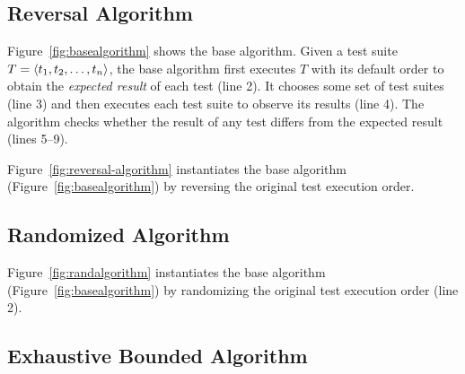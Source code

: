 \subsection{Reversal Algorithm}
\label{sec:reversal}


Figure~\ref{fig:basealgorithm} shows the base algorithm.
Given a test suite $T =  \langle t_1, t_2, \ldots, t_n \rangle $, the base algorithm
first executes $T$ with its default order
to obtain the \emph{expected result} of each test (line 2).
It chooses some set of test suites (line 3) and then executes
each test suite
to observe its results (line 4). The algorithm checks
whether the result of any test differs from the
expected result (lines 5--9). 

Figure~\ref{fig:reversal-algorithm} instantiates the
base algorithm (Figure~\ref{fig:basealgorithm})
by reversing the original test execution
order.


\subsection{Randomized Algorithm}
\label{sec:randomized}

Figure~\ref{fig:randalgorithm} instantiates the
base algorithm (Figure~\ref{fig:basealgorithm})
by randomizing the original test execution
order (line 2).





\subsection{Exhaustive Bounded Algorithm}
\label{sec:basic}

